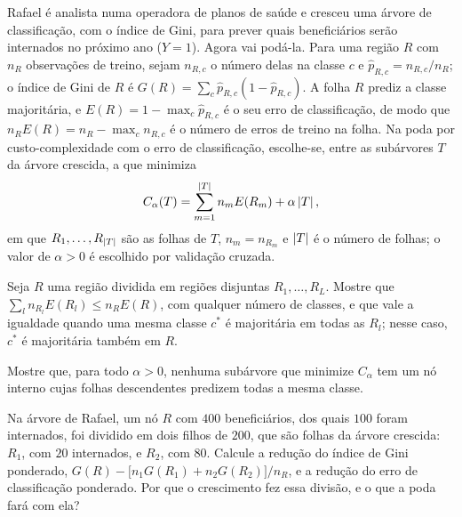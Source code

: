 Rafael é analista numa operadora de planos de saúde e cresceu uma árvore de classificação,
com o índice de Gini, para prever quais beneficiários serão internados no próximo ano
($Y=1$). Agora vai podá-la. Para uma região $R$ com $n_R$ observações de treino, sejam
$n_{R,c}$ o número delas na classe $c$ e $\widehat p_{R,c}=n_{R,c}/n_R$; o índice de Gini de
$R$ é $G(R)=\sum_c\widehat p_{R,c}(1-\widehat p_{R,c})$. A folha $R$ prediz a classe
majoritária, e $E(R)=1-\max_c\widehat p_{R,c}$ é o seu erro de classificação, de modo
que $n_RE(R)=n_R-\max_cn_{R,c}$ é o número de erros de treino na folha. Na poda por
custo-complexidade com o erro de classificação, escolhe-se, entre as subárvores $T$ da árvore
crescida, a que minimiza
\[
  C_\alpha(T)=\sum_{m=1}^{\left\lvert T \right\rvert}n_mE(R_m)+\alpha\left\lvert T \right\rvert,
\]
em que $R_1,\dots,R_{\left\lvert T \right\rvert}$ são as folhas de $T$, $n_m=n_{R_m}$ e $\left\lvert T \right\rvert$ é o número de
folhas; o valor de $\alpha>0$ é escolhido por validação cruzada.
\begin{itens}
  \item {} Seja $R$ uma região dividida em regiões disjuntas $R_1,\dots,R_L$. Mostre
        que $\sum_ln_{R_l}E(R_l)\le n_RE(R)$, com qualquer número de classes, e que vale a
        igualdade quando uma mesma classe $c^*$ é majoritária em todas as $R_l$; nesse caso,
        $c^*$ é majoritária também em $R$.
  \item {} Mostre que, para todo $\alpha>0$, nenhuma subárvore que minimize $C_\alpha$
        tem um nó interno cujas folhas descendentes predizem todas a mesma classe.
  \item {} Na árvore de Rafael, um nó $R$ com $400$ beneficiários, dos quais $100$
        foram internados, foi dividido em dois filhos de $200$, que são folhas da árvore
        crescida: $R_1$, com $20$ internados, e $R_2$, com $80$. Calcule a redução do índice
        de Gini ponderado,
        $G(R)-\big[n_1G(R_1)+n_2G(R_2)\big]/n_R$, e a redução do erro de classificação
        ponderado. Por que o crescimento fez essa divisão, e o que a poda fará com ela?
\end{itens}

